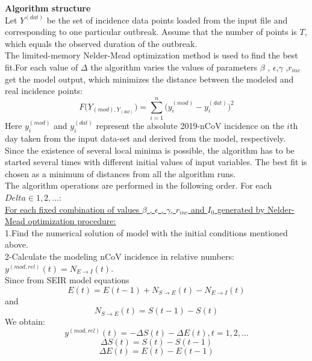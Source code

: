 \documentclass{exam}
\begin{document}
\textbf{Algorithm structure} \\

Let $Y^{(dat)}$ be the set of incidence data points loaded from the input file and corresponding to one particular outbreak. Assume that the number of points is $T$, which equals the observed duration of the outbreak.\\
The limited-memory Nelder-Mead optimization method is used to find the best fit.For each value of $\Delta$ the algorithm varies the values of parameters $\beta$ , $\epsilon$,$\gamma$ ,$r_{inc}$ get the model output, which minimizes the distance between the modeled and real incidence points:
\begin{equation} 
F\big(Y_{(mod),Y_{(dat)}}\big) = \sum_{i=1}^{n} \big(y_i^{(mod)} - y_i^{(dat)}\big)^{2}
\end{equation}
Here $y_i^{(mod)}$ and $y_i^{(dat)}$ represent the absolute 2019-nCoV incidence on the $i$th day taken from the input data-set and derived from the model, respectively.\\
Since the existence of several local minima is possible, the algorithm has to be started several times with different initial values of input variables. The best fit is chosen as a minimum of distances from all the algorithm runs.\\
The algorithm operations are performed in the following order. For each $Delta \in 1,2, \ldots$:\\

\underline{For each fixed combination of values  $\beta$ , $\epsilon$ , $\gamma$, $r_{inc}$ and $I_0$ generated by Nelder-Mead optimization procedure:
}\\

1.Find the numerical solution of model  with the initial conditions mentioned above.\\

2-Calculate the modeling nCoV incidence in relative numbers:$y^{(mod,rel)}(t)=N_{E \rightarrow I}(t)$.\\Since from SEIR model equations
\begin{equation*}
E(t)=E(t-1) +N_{S \rightarrow E}(t) -N_{E \rightarrow I}(t)
\end{equation*}
and
\begin{equation*}
N_{S \rightarrow E}(t) = S(t-1)-S(t)
\end{equation*}
We obtain:
\begin{equation*}
y^{(mod,rel)}(t) = -\Delta S(t) - \Delta E(t), t=1,2,\ldots
\end{equation*}
\begin{equation*}
\Delta S(t) =S(t)-S(t-1) \end{equation*}
\begin{equation*}\Delta E(t) = E(t) - E(t-1)\end{equation*}
\end{document}
